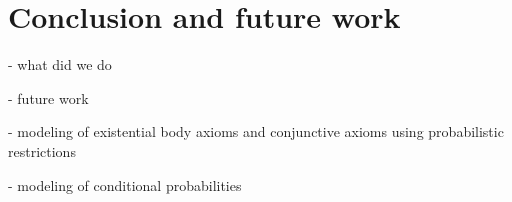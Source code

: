 
\chapter{Conclusion and future work}
\label{cap:conclusion}

- what did we do

- future work

- modeling of existential body axioms and conjunctive axioms using probabilistic restrictions

- modeling of conditional probabilities

